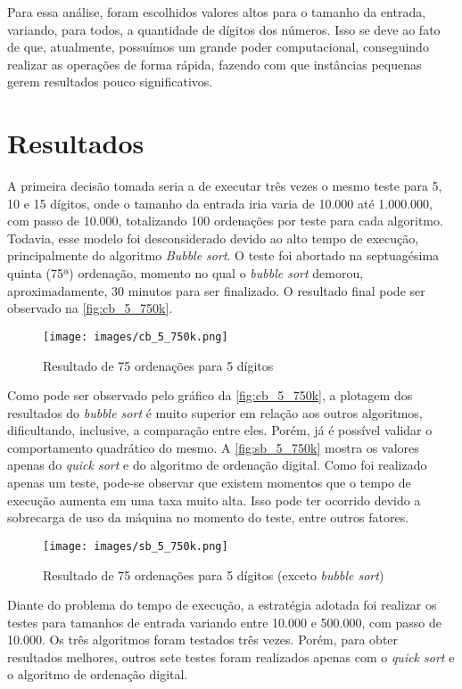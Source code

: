 \documentclass[12pt]{article}
\begin{document}
Para essa análise, foram escolhidos valores altos para o tamanho da entrada, variando, para todos, a quantidade de dígitos dos números. Isso se deve ao fato de que, atualmente, possuímos um grande poder computacional, conseguindo realizar as operações de forma rápida, fazendo com que instâncias pequenas gerem resultados pouco significativos. 

\section{Resultados}

A primeira decisão tomada seria a de executar três vezes o mesmo teste para 5, 10 e 15 dígitos, onde o tamanho da entrada iria varia de 10.000 até 1.000.000, com passo de 10.000, totalizando 100 ordenações por teste para cada algoritmo. Todavia, esse modelo foi desconsiderado devido ao alto tempo de execução, principalmente do algoritmo \textit{Bubble sort}. O teste foi abortado na septuagésima quinta (75ª) ordenação, momento no qual o \textit{bubble sort} demorou, aproximadamente, 30 minutos para ser finalizado. O resultado final pode ser observado na \autoref{fig:cb_5_750k}.

\begin{figure}[h]
	\centering
	\caption{Resultado de 75 ordenações para 5 dígitos}
	\texttt{[image: images/cb\_5\_750k.png]}
	\label{fig:cb_5_750k}
\end{figure}

Como pode ser observado pelo gráfico da \autoref{fig:cb_5_750k}, a plotagem dos resultados do \textit{bubble sort} é muito superior em relação aos outros algoritmos, dificultando, inclusive, a comparação entre eles. Porém, já é possível validar o comportamento quadrático do mesmo. A \autoref{fig:sb_5_750k} mostra os valores apenas do \textit{quick sort} e do algoritmo de ordenação digital. Como foi realizado apenas um teste, pode-se observar que existem momentos que o tempo de execução aumenta em uma taxa muito alta. Isso pode ter ocorrido devido a sobrecarga de uso da máquina no momento do teste, entre outros fatores.

\begin{figure}[h]
	\centering
	\caption{Resultado de 75 ordenações para 5 dígitos (exceto \textit{bubble sort})}
	\texttt{[image: images/sb\_5\_750k.png]}
	\label{fig:sb_5_750k}
\end{figure}

Diante do problema do tempo de execução, a estratégia adotada foi realizar os testes para tamanhos de entrada variando entre 10.000 e 500.000, com passo de 10.000. Os três algoritmos foram testados três vezes. Porém, para obter resultados melhores, outros sete testes foram realizados apenas com o \textit{quick sort} e o algoritmo de ordenação digital.
\end{document}
